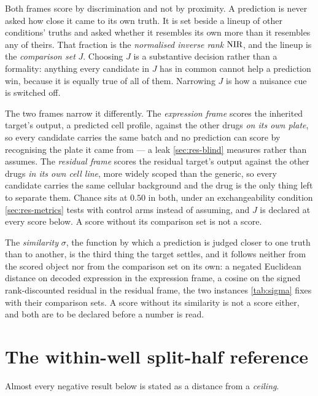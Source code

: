 Both frames score by discrimination and not by proximity. A prediction is never
asked how close it came to its own truth. It is set beside a lineup of other
conditions' truths and asked whether it resembles its own more than it resembles
any of theirs. That fraction is the \emph{normalised inverse rank}
$\textrm{NIR}$, and the lineup is the \emph{comparison set} $J$.
Choosing $J$ is a substantive decision rather than a formality: anything every
candidate in $J$ has in common cannot help a prediction win, because it is
equally true of all of them. Narrowing $J$ is how a nuisance cue is switched off.

The two frames narrow it differently. The \Eframe{} \emph{expression frame}
scores the inherited target's output, a predicted cell profile, against the other
drugs \emph{on its own plate}, so every candidate carries the same batch and no
prediction can score by recognising the plate it came from --- a leak
\cref{sec:res-blind} measures rather than assumes. The \Rframe{} \emph{residual
frame} scores the residual target's output against the other drugs \emph{in its
own cell line}, more widely scoped than the generic, so every candidate carries
the same cellular background and the drug is the only thing left to separate
them. Chance sits at $0.50$ in both, under an exchangeability condition
\cref{sec:res-metrics} tests with control arms instead of assuming, and $J$ is
declared at every score below. A score without its comparison set is not a score.

The \emph{similarity} $\sigma$, the function by which a prediction is judged
closer to one truth than to another, is the third thing the target settles, and
it follows neither from the scored object nor from the comparison set on its own:
a negated Euclidean distance on decoded expression in the expression frame, a
cosine on the signed rank-discounted residual in the residual frame, the two
instances \cref{tab:sigma} fixes with their comparison sets. A score without its
similarity is not a score either, and both are to be declared before a number is
read.



\section{The within-well split-half reference}

Almost every negative result below is stated as a distance from a
\emph{ceiling}. 

